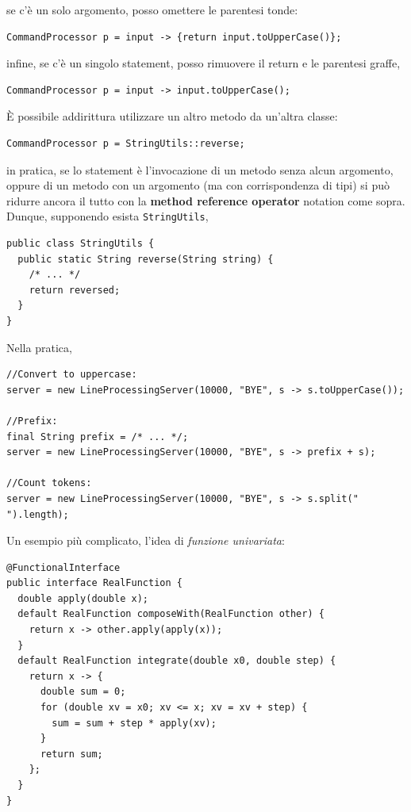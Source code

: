 \documentclass[\fontsizeclass,twocolumn]{\classname}
\theoremstyle{definition}
\theoremstyle{definition}
\begin{document}
se c'è un solo argomento, posso omettere le parentesi tonde:

\begin{lstlisting}
CommandProcessor p = input -> {return input.toUpperCase()};
\end{lstlisting}

infine, se c'è un singolo statement, posso rimuovere il return e le parentesi graffe,

\begin{lstlisting}
CommandProcessor p = input -> input.toUpperCase();
\end{lstlisting}

È possibile addirittura utilizzare un altro metodo da un'altra classe:


\begin{lstlisting}
CommandProcessor p = StringUtils::reverse;
\end{lstlisting}

in pratica, se lo statement è l'invocazione di un metodo senza alcun argomento,
oppure di un metodo con un argomento (ma con corrispondenza di tipi)
si può ridurre ancora il tutto con la \textbf{method reference operator}
notation come sopra. Dunque, supponendo esista \texttt{StringUtils},

\begin{lstlisting}
public class StringUtils {
  public static String reverse(String string) {
    /* ... */
    return reversed;
  }
}
\end{lstlisting}

Nella pratica,

\begin{lstlisting}
//Convert to uppercase:
server = new LineProcessingServer(10000, "BYE", s -> s.toUpperCase());

//Prefix:
final String prefix = /* ... */;
server = new LineProcessingServer(10000, "BYE", s -> prefix + s);

//Count tokens:
server = new LineProcessingServer(10000, "BYE", s -> s.split(" ").length);
\end{lstlisting}

Un esempio più complicato, l'idea di \emph{funzione univariata}:

\begin{lstlisting}
@FunctionalInterface
public interface RealFunction {  
  double apply(double x);
  default RealFunction composeWith(RealFunction other) {
    return x -> other.apply(apply(x));
  }
  default RealFunction integrate(double x0, double step) {
    return x -> {
      double sum = 0;
      for (double xv = x0; xv <= x; xv = xv + step) {
        sum = sum + step * apply(xv);
      }
      return sum;
    };
  }
}
\end{lstlisting}
\end{document}
